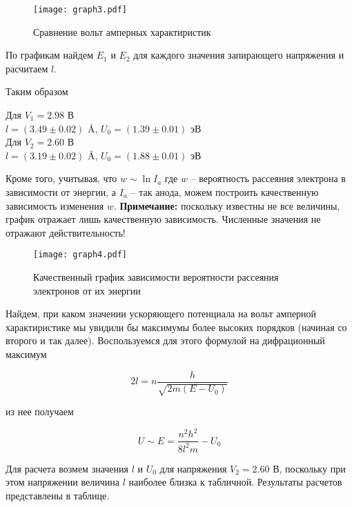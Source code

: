     \begin{figure}
        \centering
        \texttt{[image: graph3.pdf]}
        \caption{Сравнение вольт амперных характиристик}
        \label{fig:V1vsV2}
    \end{figure}

    По графикам найдем $E_1$ и $E_2$ для каждого значения запирающего напряжения и расчитаем $l$.

    

    Таким образом

    \begin{center}
        Для $V_1 = 2.98$ В \\ $l = (3.49 \pm 0.02)$ \AA, $U_0 = (1.39 \pm 0.01)$ эВ \\[0.5 cm]
        Для $V_2 = 2.60$ В \\ $l = (3.19 \pm 0.02)$ \AA, $U_0 = (1.88 \pm 0.01)$ эВ \\[0.5 cm]
    \end{center}

    Кроме того, учитывая, что $w \sim \ln I_a$ где $w$ -- вероятность рассеяния электрона в зависимости от энергии, а $I_a$ --
    так анода, можем построить качественную зависимость изменения $w$. \textbf{Примечание:} поскольку известны не все величины,
    график отражает лишь качественную зависимость. Численные значения не отражают действительность!

    \begin{figure}
        \centering
        \texttt{[image: graph4.pdf]}
        \caption{Качественный график зависимости вероятности рассеяния электронов от их энергии}
        \label{fig:graph4}
    \end{figure}

    Найдем, при каком значении ускоряющего потенциала на вольт амперной характиристике мы увидили бы максимумы более высоких
    порядков (начиная со второго и так далее). Воспользуемся для этого формулой на дифрационный максимум

    \begin{equation}
        2 l = n \frac{h}{\sqrt{2m (E - U_0)}}
    \end{equation}

    из нее получаем

    \begin{equation}
        U \sim E = \frac{n^2 h^2}{8 l^2 m} - U_0
    \end{equation}

    Для расчета возмем значения $l$ и $U_0$ для напряжения $V_2 = 2.60$ В, поскольку при этом напряжении величина $l$ наиболее
    близка к табличной. Результаты расчетов представлены в таблице.

